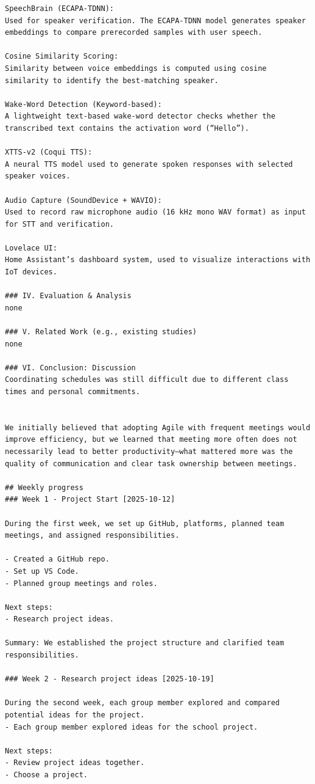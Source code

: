 \documentclass[conference]{IEEEtran}
\begin{document}
\begin{lstlisting}
SpeechBrain (ECAPA-TDNN):
Used for speaker verification. The ECAPA-TDNN model generates speaker embeddings to compare prerecorded samples with user speech.

Cosine Similarity Scoring:
Similarity between voice embeddings is computed using cosine similarity to identify the best-matching speaker.

Wake-Word Detection (Keyword-based):
A lightweight text-based wake-word detector checks whether the transcribed text contains the activation word (“Hello”).

XTTS-v2 (Coqui TTS):
A neural TTS model used to generate spoken responses with selected speaker voices.

Audio Capture (SoundDevice + WAVIO):
Used to record raw microphone audio (16 kHz mono WAV format) as input for STT and verification.

Lovelace UI:
Home Assistant’s dashboard system, used to visualize interactions with IoT devices.

### IV. Evaluation & Analysis
none

### V. Related Work (e.g., existing studies)
none

### VI. Conclusion: Discussion
Coordinating schedules was still difficult due to different class times and personal commitments. 


We initially believed that adopting Agile with frequent meetings would 
improve efficiency, but we learned that meeting more often does not 
necessarily lead to better productivity—what mattered more was the 
quality of communication and clear task ownership between meetings.

## Weekly progress 
### Week 1 - Project Start [2025-10-12]

During the first week, we set up GitHub, platforms, planned team meetings, and assigned responsibilities.

- Created a GitHub repo.
- Set up VS Code.
- Planned group meetings and roles.

Next steps:
- Research project ideas.

Summary: We established the project structure and clarified team responsibilities.

### Week 2 - Research project ideas [2025-10-19]

During the second week, each group member explored and compared potential ideas for the project.
- Each group member explored ideas for the school project.

Next steps:
- Review project ideas together.
- Choose a project.


\end{lstlisting}
\end{document}
